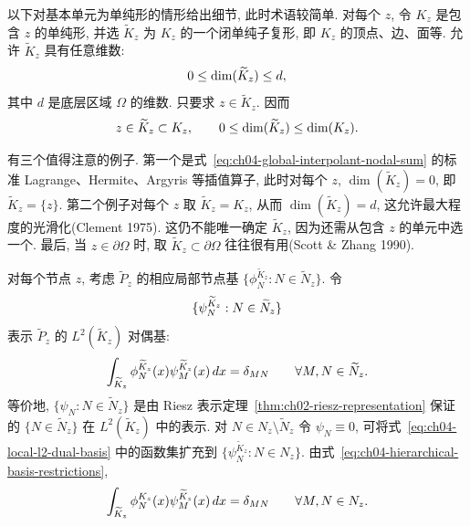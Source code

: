 以下对基本单元为单纯形的情形给出细节, 此时术语较简单. 对每个 $z$, 令 $K_z$ 是包含 $z$ 的单纯形, 并选 $\widetilde K_z$ 为 $K_z$ 的一个闭单纯子复形, 即 $K_z$ 的顶点、边、面等. 允许 $\widetilde K_z$ 具有任意维数:
\[
\MathBookFormulaID{formula-ch04-smoothing-simplex-dimension}
0\leq\dim(\widetilde K_z)\leq d,
\]
其中 $d$ 是底层区域 $\Omega$ 的维数. 只要求 $z\in\widetilde K_z$. 因而
\[
\MathBookFormulaID{formula-ch04-smoothing-simplex-inclusions}
z\in\widetilde K_z\subset K_z,
\qquad0\leq\dim(\widetilde K_z)\leq\dim(K_z).
\]

有三个值得注意的例子. 第一个是式~\eqref{eq:ch04-global-interpolant-nodal-sum} 的标准 Lagrange、Hermite、Argyris 等插值算子, 此时对每个 $z$, $\dim(\widetilde K_z)=0$, 即 $\widetilde K_z=\{z\}$. 第二个例子对每个 $z$ 取 $\widetilde K_z=K_z$, 从而 $\dim(\widetilde K_z)=d$, 这允许最大程度的光滑化(Clement 1975). 这仍不能唯一确定 $\widetilde K_z$, 因为还需从包含 $z$ 的单元中选一个. 最后, 当 $z\in\partial\Omega$ 时, 取 $\widetilde K_z\subset\partial\Omega$ 往往很有用(Scott \& Zhang 1990).

对每个节点 $z$, 考虑 $\widetilde P_z$ 的相应局部节点基 $\{\phi_N^{\widetilde K_z}:N\in\widetilde N_z\}$. 令
\begin{equation}
\MathBookFormulaID{formula-ch04-local-l2-dual-basis}
\label{eq:ch04-local-l2-dual-basis}
\{\psi_N^{\widetilde K_z}:N\in\widetilde N_z\}
\end{equation}
表示 $\widetilde P_z$ 的 $L^2(\widetilde K_z)$ 对偶基:
\begin{equation}
\MathBookFormulaID{formula-ch04-local-l2-duality}
\label{eq:ch04-local-l2-duality}
\int_{\widetilde K_z}\phi_N^{\widetilde K_z}(x)
\psi_M^{\widetilde K_z}(x)\,dx=\delta_{MN}
\qquad\forall M,N\in\widetilde N_z.
\end{equation}
等价地, $\{\psi_N:N\in\widetilde N_z\}$ 是由 Riesz 表示定理~\ref{thm:ch02-riesz-representation} 保证的 $\{N\in\widetilde N_z\}$ 在 $L^2(\widetilde K_z)$ 中的表示. 对 $N\in N_z\setminus\widetilde N_z$ 令 $\psi_N\equiv0$, 可将式~\eqref{eq:ch04-local-l2-dual-basis} 中的函数集扩充到 $\{\psi_N^{\widetilde K_z}:N\in N_z\}$. 由式~\eqref{eq:ch04-hierarchical-basis-restrictions},
\begin{equation}
\MathBookFormulaID{formula-ch04-extended-local-l2-duality}
\label{eq:ch04-extended-local-l2-duality}
\int_{\widetilde K_z}\phi_N^{K_z}(x)\psi_M^{\widetilde K_z}(x)\,dx
=\delta_{MN}
\qquad\forall M,N\in N_z.
\end{equation}

